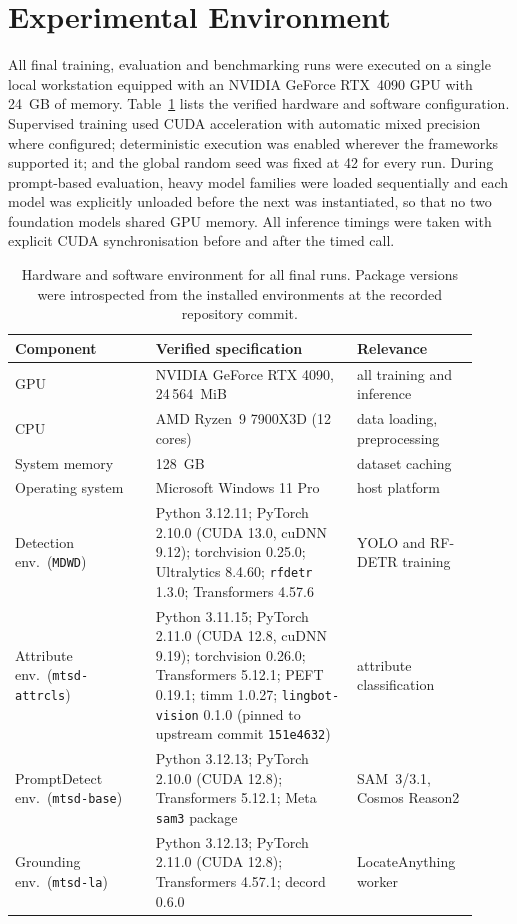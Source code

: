 \section{Experimental Environment}
\label{sec:experimental-environment}

All final training, evaluation and benchmarking runs were executed on a single local workstation equipped with an NVIDIA GeForce RTX~4090 GPU with 24~GB of memory. Table~\ref{tab:environment} lists the verified hardware and software configuration. Supervised training used CUDA acceleration with automatic mixed precision where configured; deterministic execution was enabled wherever the frameworks supported it; and the global random seed was fixed at 42 for every run. During prompt-based evaluation, heavy model families were loaded sequentially and each model was explicitly unloaded before the next was instantiated, so that no two foundation models shared GPU memory. All inference timings were taken with explicit CUDA synchronisation before and after the timed call.

\begin{table}[htbp]
\centering
\caption{Hardware and software environment for all final runs. Package versions were introspected from the installed environments at the recorded repository commit.}
\label{tab:environment}
\small
\begin{tabular}{p{0.28\linewidth}p{0.40\linewidth}p{0.24\linewidth}}
\hline
\textbf{Component} & \textbf{Verified specification} & \textbf{Relevance} \\
\hline
GPU & NVIDIA GeForce RTX 4090, 24\,564~MiB & all training and inference \\
CPU & AMD Ryzen~9 7900X3D (12 cores) & data loading, preprocessing \\
System memory & 128~GB & dataset caching \\
Operating system & Microsoft Windows 11 Pro & host platform \\
\hline
Detection env.\ (\texttt{MDWD}) & Python 3.12.11; PyTorch 2.10.0 (CUDA 13.0, cuDNN 9.12); torchvision 0.25.0; Ultralytics 8.4.60; \texttt{rfdetr} 1.3.0; Transformers 4.57.6 & YOLO and RF-DETR training \\
Attribute env.\ (\texttt{mtsd-attrcls}) & Python 3.11.15; PyTorch 2.11.0 (CUDA 12.8, cuDNN 9.19); torchvision 0.26.0; Transformers 5.12.1; PEFT 0.19.1; timm 1.0.27; \texttt{lingbot-vision} 0.1.0 (pinned to upstream commit \texttt{151e4632}) & attribute classification \\
PromptDetect env.\ (\texttt{mtsd-base}) & Python 3.12.13; PyTorch 2.10.0 (CUDA 12.8); Transformers 5.12.1; Meta \texttt{sam3} package & SAM~3/3.1, Cosmos Reason2 \\
Grounding env.\ (\texttt{mtsd-la}) & Python 3.12.13; PyTorch 2.11.0 (CUDA 12.8); Transformers 4.57.1; decord 0.6.0 & LocateAnything worker \\
\hline
\end{tabular}
\end{table}


